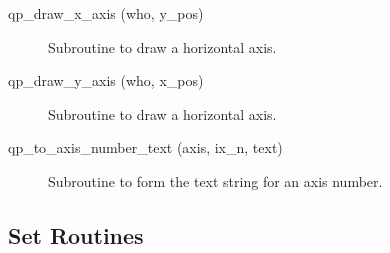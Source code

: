 \begin{description}
\item[qp_draw_x_axis (who, y_pos)] \Newline 
     Subroutine to draw a horizontal axis.

\item[qp_draw_y_axis (who, x_pos)] \Newline 
     Subroutine to draw a horizontal axis.

\item[qp_to_axis_number_text (axis, ix_n, text)] \Newline 
     Subroutine to form the text string for an axis number.

\end{description}

\subsection{Set Routines}

